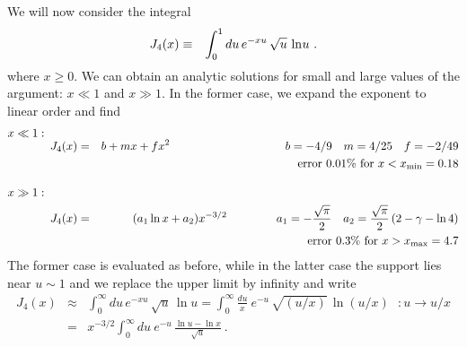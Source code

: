 \documentclass[preprint,12pt,eqsecnum,nofootinbib,amsmath,amssymb]{revtex4}
\begin{document}
We will now consider the integral
\begin{eqnarray}
  J_4(x) &\equiv &
  \int_0^1 du\,e^{-x u} \, \sqrt{u}\, 
  \ln \hskip-0.05cm u  \ .
\end{eqnarray}
where $x \ge 0$. We can obtain an analytic solutions for small and large 
values of the argument: $x \ll 1$ and $x \gg 1$. In the former case, we 
expand the exponent to linear order and find
\begin{eqnarray} 
\nonumber
  x \ll 1: \hskip1cm &&
\\[-5pt]
  J_4(x) &=& b + m x + f x^2
  \hskip3.5cm   b= -4/9  ~~~ m= 4/25 ~~~ f= -2/49
\\\nonumber &&
  \hskip-1.3cm {\rm error~} 0.01\% {\rm ~for~} x< x_{\rm min}=0.18
\\[10pt]
\nonumber
  x \gg 1: \hskip1cm &&
\\
  J_4(x) &=& (a_1 \ln x + a_2) x^{-3/2}
  \hskip1.5cm a_1 = -\frac{\sqrt{\pi}}{2}~~~
  a_2 = \frac{\sqrt{\pi}}{2}\,(2 - \gamma - \ln4)
\\\nonumber &&
  \hskip-1.3cm {\rm error~} 0.3\% {\rm ~for~} x> x_{\rm max}=4.7
\end{eqnarray}
The former case is evaluated as before, while in the latter case 
the support lies near $u \sim 1$ and we replace the upper limit by 
infinity and write
\begin{eqnarray}
  J_4(x) 
  &\approx&
  \int_0^\infty  du\,e^{-x u} \, \sqrt{u} \, \ln u
  =
  \int_0^\infty  \frac{du}{x} ~ e^{-u} \, 
  \sqrt{(u/x)} \, \ln (u/x)
  ~~~ : u \to u/x
\\[5pt]
  &=&
  x^{-3/2}\int_0^\infty  du ~ e^{-u} \, 
  \frac{\ln u  - \ln x}{\sqrt{u}} \ .
\end{eqnarray}
\end{document}

